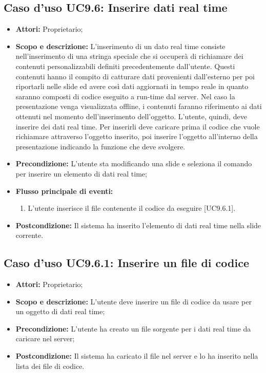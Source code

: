 \subsection{Caso d'uso UC9.6: Inserire dati real time}
\begin{itemize}
	\item \textbf{Attori:} Proprietario;
	\item \textbf{Scopo e descrizione:}	L'inserimento di un dato \gls{real time} consiste nell'inserimento di una stringa speciale che si occuperà di richiamare dei contenuti personalizzabili definiti precedentemente dall'utente. Questi contenuti hanno il compito di catturare dati provenienti dall'esterno per poi riportarli nelle \gls{slide} ed avere così dati aggiornati in tempo reale in quanto saranno composti di codice eseguito a run-time dal server. Nel caso la presentazione venga visualizzata offline, i contenuti faranno riferimento ai dati ottenuti nel momento dell'inserimento dell'oggetto.
	L'utente, quindi, deve inserire dei dati \gls{real time}. Per inserirli deve caricare prima il codice che vuole richiamare attraverso l'oggetto inserito, poi inserire l'oggetto all'interno della presentazione indicando la funzione che deve svolgere.
	
	\item \textbf{Precondizione:} L'utente sta modificando una \gls{slide} e seleziona il comando per inserire un elemento di dati \gls{real time};
	\item \textbf{Flusso principale di eventi:}
	\begin{enumerate}
		\item L'utente inserisce il file contenente il codice da eseguire [UC9.6.1].
	\end{enumerate}
	\item \textbf{Postcondizione:} Il sistema ha inserito l'elemento di dati \gls{real time} nella \gls{slide} corrente.
\end{itemize}

	\subsection{Caso d'uso UC9.6.1: Inserire un file di codice}
	\begin{itemize}
		\item \textbf{Attori:} Proprietario;
		\item \textbf{Scopo e descrizione:} L'utente deve inserire un file di codice da usare per un oggetto di dati \gls{real time};
		\item \textbf{Precondizione:} L'utente ha creato un file sorgente per i dati real time da caricare nel server;
		\item \textbf{Postcondizione:} Il sistema ha caricato il file nel server e lo ha inserito nella lista dei file di codice.
	\end{itemize}
	

